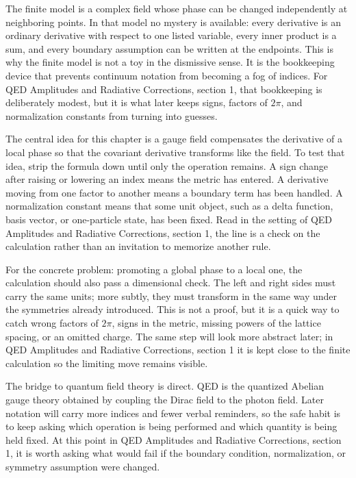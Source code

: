 The finite model is a complex field whose phase can be changed independently at neighboring points.  In that model no mystery is available: every derivative is an ordinary derivative with respect to one listed variable, every inner product is a sum, and every boundary assumption can be written at the endpoints.  This is why the finite model is not a toy in the dismissive sense.  It is the bookkeeping device that prevents continuum notation from becoming a fog of indices.  For QED Amplitudes and Radiative Corrections, section 1, that bookkeeping is deliberately modest, but it is what later keeps signs, factors of \(2\pi\), and normalization constants from turning into guesses.

The central idea for this chapter is a gauge field compensates the derivative of a local phase so that the covariant derivative transforms like the field.  To test that idea, strip the formula down until only the operation remains.  A sign change after raising or lowering an index means the metric has entered.  A derivative moving from one factor to another means a boundary term has been handled.  A normalization constant means that some unit object, such as a delta function, basis vector, or one-particle state, has been fixed.  Read in the setting of QED Amplitudes and Radiative Corrections, section 1, the line is a check on the calculation rather than an invitation to memorize another rule.

For the concrete problem: promoting a global phase to a local one, the calculation should also pass a dimensional check.  The left and right sides must carry the same units; more subtly, they must transform in the same way under the symmetries already introduced.  This is not a proof, but it is a quick way to catch wrong factors of \(2\pi\), signs in the metric, missing powers of the lattice spacing, or an omitted charge.  The same step will look more abstract later; in QED Amplitudes and Radiative Corrections, section 1 it is kept close to the finite calculation so the limiting move remains visible.

The bridge to quantum field theory is direct.  QED is the quantized Abelian gauge theory obtained by coupling the Dirac field to the photon field.  Later notation will carry more indices and fewer verbal reminders, so the safe habit is to keep asking which operation is being performed and which quantity is being held fixed.  At this point in QED Amplitudes and Radiative Corrections, section 1, it is worth asking what would fail if the boundary condition, normalization, or symmetry assumption were changed.

